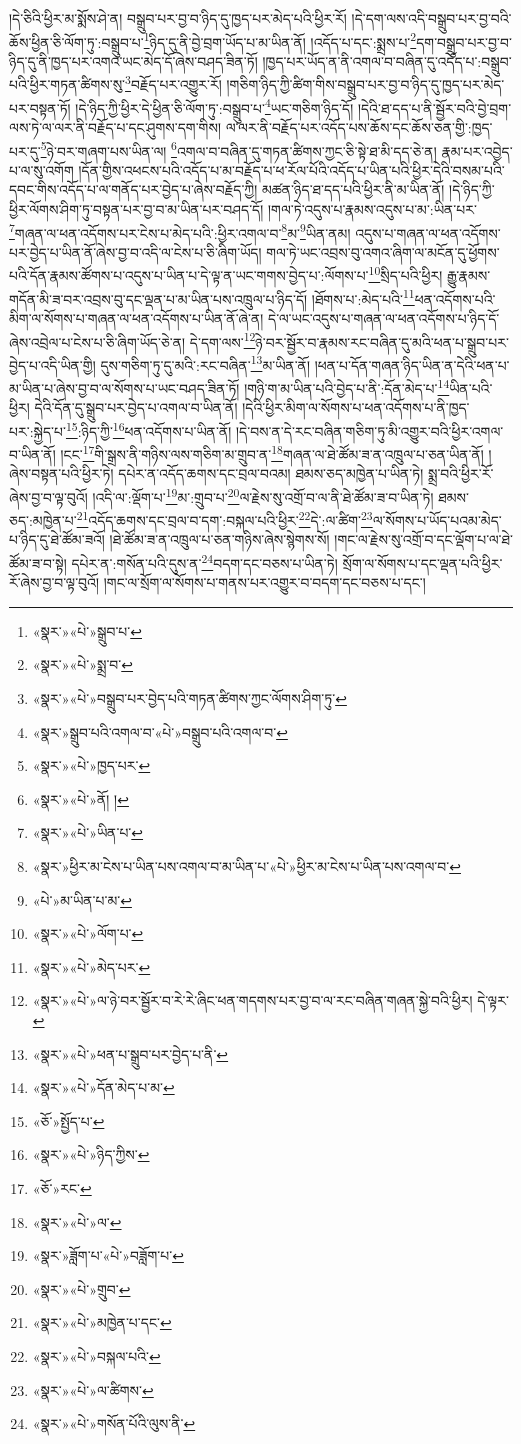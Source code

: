 །དེ་ཅིའི་ཕྱིར་མ་སྨོས་ཤེ་ན། བསྒྲུབ་པར་བྱ་བ་ཉིད་དུ་ཁྱད་པར་མེད་པའི་ཕྱིར་རོ། །དེ་དག་ལས་འདི་བསྒྲུབ་པར་བྱ་བའི་ཆོས་ཕྱིན་ཅི་ལོག་ཏུ་:བསྒྲུབ་པ་\footnote{«སྣར་»«པེ་»སྒྲུབ་པ་}ཉིད་དུ་ནི་བྱེ་བྲག་ཡོད་པ་མ་ཡིན་ནོ། །འདོད་པ་དང་:སྨྲས་པ་\footnote{«སྣར་»«པེ་»སྨྲ་བ་}དག་བསྒྲུབ་པར་བྱ་བ་ཉིད་དུ་ནི་ཁྱད་པར་འགའ་ཡང་མེད་དོ་ཞེས་བཤད་ཟིན་ཏོ། །ཁྱད་པར་ཡོད་ན་ནི་འགལ་བ་བཞིན་དུ་འདོད་པ་:བསྒྲུབ་པའི་ཕྱིར་གཏན་ཚིགས་སུ་\footnote{«སྣར་»«པེ་»བསྒྲུབ་པར་བྱེད་པའི་གཏན་ཚིགས་ཀྱང་ལོགས་ཤིག་ཏུ་}བརྗོད་པར་འགྱུར་རོ། །གཅིག་ཉིད་ཀྱི་ཚིག་གིས་བསྒྲུབ་པར་བྱ་བ་ཉིད་དུ་ཁྱད་པར་མེད་པར་བསྟན་ཏོ། །དེ་ཉིད་ཀྱི་ཕྱིར་དེ་ཕྱིན་ཅི་ལོག་ཏུ་:བསྒྲུབ་པ་\footnote{«སྣར་»སྒྲུབ་པའི་འགལ་བ་«པེ་»བསྒྲུབ་པའི་འགལ་བ་}ཡང་གཅིག་ཉིད་དོ། །དེའི་ཐ་དད་པ་ནི་སྦྱོར་བའི་བྱེ་བྲག་ལས་ཏེ་ལ་ལར་ནི་བརྗོད་པ་དང་ཤུགས་དག་གིས། ལ་ལར་ནི་བརྗོད་པར་འདོད་པས་ཆོས་དང་ཆོས་ཅན་གྱི་:ཁྱད་པར་དུ་\footnote{«སྣར་»«པེ་»ཁྱད་པར་}ཉེ་བར་གཞག་པས་ཡིན་ལ། \footnote{«སྣར་»«པེ་»ནོ། ། }འགལ་བ་བཞིན་དུ་གཏན་ཚིགས་ཀྱང་ཅི་སྟེ་ཐ་མི་དད་ཅེ་ན། རྣམ་པར་འབྱེད་པ་ལ་སུ་འགོག །དོན་གྱིས་འཕངས་པའི་འདོད་པ་མ་བརྗོད་པ་ཕ་རོལ་པོའི་འདོད་པ་ཡིན་པའི་ཕྱིར་དེའི་བསམ་པའི་དབང་གིས་འདོད་པ་ལ་གནོད་པར་བྱེད་པ་ཞེས་བརྗོད་ཀྱི། མཚན་ཉིད་ཐ་དད་པའི་ཕྱིར་ནི་མ་ཡིན་ནོ། །དེ་ཉིད་ཀྱི་ཕྱིར་ལོགས་ཤིག་ཏུ་བསྟན་པར་བྱ་བ་མ་ཡིན་པར་བཤད་དོ། །གལ་ཏེ་འདུས་པ་རྣམས་འདུས་པ་མ་:ཡིན་པར་\footnote{«སྣར་»«པེ་»ཡིན་པ་}གཞན་ལ་ཕན་འདོགས་པར་ངེས་པ་མེད་པའི་:ཕྱིར་འགལ་བ་\footnote{«སྣར་»ཕྱིར་མ་ངེས་པ་ཡིན་པས་འགལ་བ་མ་ཡིན་པ་«པེ་»ཕྱིར་མ་ངེས་པ་ཡིན་པས་འགལ་བ་}མ་\footnote{«པེ་»མ་ཡིན་པ་མ་}ཡིན་ནམ། འདུས་པ་གཞན་ལ་ཕན་འདོགས་པར་བྱེད་པ་ཡིན་ནོ་ཞེས་བྱ་བ་འདི་ལ་ངེས་པ་ཅི་ཞིག་ཡོད། གལ་ཏེ་ཡང་འབྲས་བུ་འགའ་ཞིག་ལ་མངོན་དུ་ཕྱོགས་པའི་དོན་རྣམས་ཚོགས་པ་འདུས་པ་ཡིན་པ་དེ་ལྟ་ན་ཡང་གགས་བྱེད་པ་:ལོགས་པ་\footnote{«སྣར་»«པེ་»ལོག་པ་}སྲིད་པའི་ཕྱིར། རྒྱུ་རྣམས་གདོན་མི་ཟ་བར་འབྲས་བུ་དང་ལྡན་པ་མ་ཡིན་པས་འཁྲུལ་པ་ཉིད་དོ། །ཐོགས་པ་:མེད་པའི་\footnote{«སྣར་»«པེ་»མེད་པར་}ཕན་འདོགས་པའི་མིག་ལ་སོགས་པ་གཞན་ལ་ཕན་འདོགས་པ་ཡིན་ནོ་ཞེ་ན། དེ་ལ་ཡང་འདུས་པ་གཞན་ལ་ཕན་འདོགས་པ་ཉིད་དོ་ཞེས་འབྲེལ་པ་ངེས་པ་ཅི་ཞིག་ཡོད་ཅེ་ན། དེ་དག་ལས་\footnote{«སྣར་»«པེ་»ལ་ཉེ་བར་སྦྱོར་བ་རེ་རེ་ཞིང་ཕན་གདགས་པར་བྱ་བ་ལ་རང་བཞིན་གཞན་སྐྱེ་བའི་ཕྱིར། དེ་ལྟར་}ཉེ་བར་སྦྱོར་བ་རྣམས་རང་བཞིན་དུ་མའི་ཕན་པ་སྒྲུབ་པར་བྱེད་པ་འདི་ཡིན་གྱི། དུས་གཅིག་ཏུ་དུ་མའི་:རང་བཞིན་\footnote{«སྣར་»«པེ་»ཕན་པ་སྒྲུབ་པར་བྱེད་པ་ནི་}མ་ཡིན་ནོ། །ཕན་པ་དོན་གཞན་ཉིད་ཡིན་ན་དེའི་ཕན་པ་མ་ཡིན་པ་ཞེས་བྱ་བ་ལ་སོགས་པ་ཡང་བཤད་ཟིན་ཏོ། །གཉི་ག་མ་ཡིན་པའི་བྱེད་པ་ནི་:དོན་མེད་པ་\footnote{«སྣར་»«པེ་»དོན་མེད་པ་མ་}ཡིན་པའི་ཕྱིར། དེའི་དོན་དུ་སྒྲུབ་པར་བྱེད་པ་འགལ་བ་ཡིན་ནོ། །དེའི་ཕྱིར་མིག་ལ་སོགས་པ་ཕན་འདོགས་པ་ནི་ཁྱད་པར་:སྐྱེད་པ་\footnote{«ཅོ་»སྤྱོད་པ་}:ཉིད་ཀྱི་\footnote{«སྣར་»«པེ་»ཉིད་ཀྱིས་}ཕན་འདོགས་པ་ཡིན་ནོ། །དེ་བས་ན་དེ་རང་བཞིན་གཅིག་ཏུ་མི་འགྱུར་བའི་ཕྱིར་འགལ་བ་ཡིན་ནོ། །ངང་\footnote{«ཅོ་»རང་}གི་སྒྲས་ནི་གཉིས་ལས་གཅིག་མ་གྲུབ་ན་\footnote{«སྣར་»«པེ་»ལ་}གཞན་ལ་ཐེ་ཚོམ་ཟ་ན་འཁྲུལ་པ་ཅན་ཡིན་ནོ། །ཞེས་བསྟན་པའི་ཕྱིར་ཏེ། དཔེར་ན་འདོད་ཆགས་དང་བྲལ་བའམ། ཐམས་ཅད་མཁྱེན་པ་ཡིན་ཏེ། སྨྲ་བའི་ཕྱིར་རོ་ཞེས་བྱ་བ་ལྟ་བུའོ། །འདི་ལ་:ལྡོག་པ་\footnote{«སྣར་»ཟློག་པ་«པེ་»བཟློག་པ་}མ་:གྲུབ་པ་\footnote{«སྣར་»«པེ་»གྲུབ་}ལ་རྗེས་སུ་འགྲོ་བ་ལ་ནི་ཐེ་ཚོམ་ཟ་བ་ཡིན་ཏེ། ཐམས་ཅད་:མཁྱེན་པ་\footnote{«སྣར་»«པེ་»མཁྱེན་པ་དང་}འདོད་ཆགས་དང་བྲལ་བ་དག་:བསྐལ་པའི་ཕྱིར་\footnote{«སྣར་»«པེ་»བསྐལ་པའི་}དེ་:ལ་ཚིག་\footnote{«སྣར་»«པེ་»ལ་ཚིགས་}ལ་སོགས་པ་ཡོད་པའམ་མེད་པ་ཉིད་དུ་ཐེ་ཚོམ་ཟའོ། །ཐེ་ཚོམ་ཟ་ན་འཁྲུལ་པ་ཅན་གཉིས་ཞེས་སྙེགས་སོ། །གང་ལ་རྗེས་སུ་འགྲོ་བ་དང་ལྡོག་པ་ལ་ཐེ་ཚོམ་ཟ་བ་སྟེ། དཔེར་ན་:གསོན་པའི་དུས་ན་\footnote{«སྣར་»«པེ་»གསོན་པོའི་ལུས་ནི་}བདག་དང་བཅས་པ་ཡིན་ཏེ། སྲོག་ལ་སོགས་པ་དང་ལྡན་པའི་ཕྱིར་རོ་ཞེས་བྱ་བ་ལྟ་བུའོ། །གང་ལ་སྲོག་ལ་སོགས་པ་གནས་པར་འགྱུར་བ་བདག་དང་བཅས་པ་དང་། 